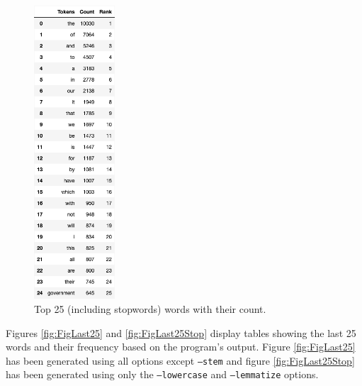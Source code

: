 \documentclass[titlepage]{article}
\begin{document}
\begin{figure}[H]
    \centering
    \includegraphics[width=0.27\textwidth]{figures/df_top25_stopwords.png}
    \caption{Top 25 (including stopwords) words with their count.}
    \label{fig:FigTop25Stop}
\end{figure}

Figures \ref{fig:FigLast25} and \ref{fig:FigLast25Stop} display tables showing the last 25 words and
their frequency based on the program's output. Figure \ref{fig:FigLast25} has been generated using 
all options except \texttt{--stem} and figure \ref{fig:FigLast25Stop} has been generated using only 
the \texttt{--lowercase} and \texttt{--lemmatize} options.
\end{document}
